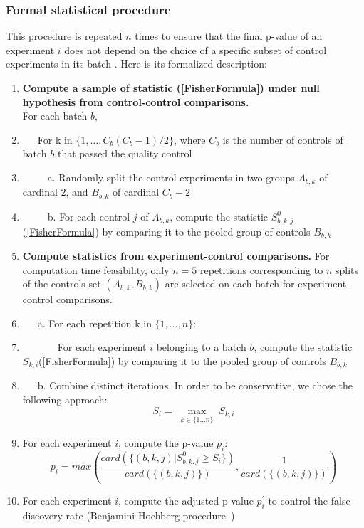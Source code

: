 \subsubsection{Formal statistical procedure}
This procedure is repeated $n$ times to ensure that the final p-value of an experiment $i$ does not depend on the choice of a specific subset of control experiments in its batch%
. Here is its formalized description:
\begin{enumerate}
\item {\bf Compute a sample of statistic (\ref{FisherFormula})  under null hypothesis from control-control comparisons.}\\ For each batch $b$,
\item[] \ \ \
 For k in $\{1,\ldots,C_b(C_b-1)/2\}$, where $C_b$ is the number of controls of batch $b$ that passed the quality control
\item[] \ \ \ \ \ a. Randomly split the control experiments in two
  groups $A_{b,k}$ of cardinal $2$, and $B_{b,k}$ of cardinal $C_b-2$
\item[] \ \ \ \ \ b. For each control $j$ of $A_{b,k}$, compute the statistic $S^{0}_{b,k,j}$ (\ref{FisherFormula}) by comparing it to the pooled group of controls $B_{b,k}$

\item {\bf Compute statistics from experiment-control comparisons.} For computation time feasibility, only $n=5$ repetitions corresponding to $n$ splits of the controls set $(A_{b,k}, B_{b,k})$ are selected on each batch for experiment-control comparisons. 
\item[] \ \ \ a. For each repetition k in $\{1,\ldots,n\}$:
\item[]\ \ \ \ \ \ \ For each experiment $i$  belonging to a batch $b$, compute the statistic $S_{k,i}$(\ref{FisherFormula}) by comparing it to the pooled group of controls $B_{b,k}$
\item[] \ \ \  b. Combine distinct iterations. In order to be conservative, we chose the following approach:
\begin{equation}
S_{i} = {\max}_{\substack{k \in \{1\ldots n \}}} S_{k,i}
\end{equation}

\item  For each experiment $i$, compute the p-value $p_{i}$:
\[p_{i} =max \left( \dfrac{card( \{(b,k,j) | S^{0}_{b,k,j}\geq S_{i} \})}
{card( \{ (b,k,j) \})},
 \dfrac{1}
 {card( \{ (b,k,j) \})}\right) \]
\item For each experiment $i$, compute the adjusted p-value $p^\prime_{i}$ to control the false discovery rate (Benjamini-Hochberg procedure~\cite{Benjamini1})
\end{enumerate}
